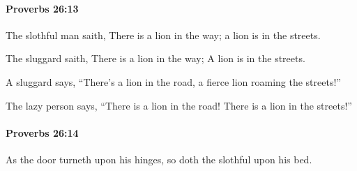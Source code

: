 		\paragraph{Proverbs 26:13} %
			\label{PROVERBS-26-13}

			The slothful man saith, There is a lion in the way; a lion is in the streets.

			\begin{versebox}
					\item[BHS] 
					\item[ASV] The sluggard saith, There is a lion in the way; A lion is in the streets.
					\item[NIV] A sluggard says, “There’s a lion in the road, a fierce lion roaming the streets!”
					\item[NRSV] The lazy person says, “There is a lion in the road! There is a lion in the streets!”
			\end{versebox}

		\paragraph{Proverbs 26:14} %
			\label{PROVERBS-26-14}

			As the door turneth upon his hinges, so doth the slothful upon his bed.

